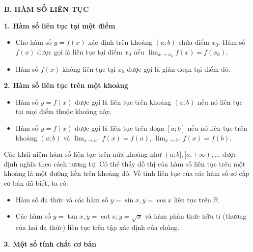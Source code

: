 \documentclass[12pt,a4paper]{extarticle}
\begin{document}
\noindent\textbf{B. HÀM SỐ LIÊN TỤC}

\noindent\textbf{1. Hàm số liên tục tại một điểm}
\begin{itemize}
    \item Cho hàm số $y = f(x)$ xác định trên khoảng $(a; b)$ chứa điểm $x_0$. Hàm số $f(x)$ được gọi là liên tục tại điểm $x_0$ nếu $\lim_{x \to x_0} f(x) = f(x_0)$.
    \item Hàm số $f(x)$ không liên tục tại $x_0$ được gọi là gián đoạn tại điểm đó.
\end{itemize}

\vspace{0.4cm}
\noindent\textbf{2. Hàm số liên tục trên một khoảng}
\begin{itemize}
    \item Hàm số $y = f(x)$ được gọi là liên tục trên khoảng $(a; b)$ nếu nó liên tục tại mọi điểm thuộc khoảng này.
    \item Hàm số $y = f(x)$ được gọi là liên tục trên đoạn $[a; b]$ nếu nó liên tục trên khoảng $(a; b)$ và $\lim_{x \to a^+} f(x) = f(a)$, $\lim_{x \to b^-} f(x) = f(b)$.
\end{itemize}
\noindent Các khái niệm hàm số liên tục trên nửa khoảng như $(a; b], [a; +\infty), \dots$ được định nghĩa theo cách tương tự. Có thể thấy đồ thị của hàm số liên tục trên một khoảng là một đường liền trên khoảng đó.
\vspace{0.3cm}
\noindent Về tính liên tục của các hàm số sơ cấp cơ bản đã biết, ta có:
\begin{itemize}
    \item Hàm số đa thức và các hàm số $y = \sin x, y = \cos x$ liên tục trên $\mathbb{R}$.
    \item Các hàm số $y = \tan x, y = \cot x, y = \sqrt{x}$ và hàm phân thức hữu tỉ (thương của hai đa thức) liên tục trên tập xác định của chúng.
\end{itemize}
\vspace{0.4cm}

\noindent\textbf{3. Một số tính chất cơ bản}
\end{document}
